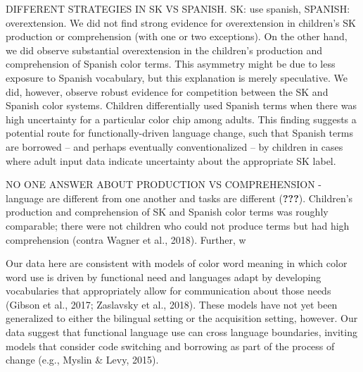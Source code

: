 \documentclass[
  english,
  ,man,floatsintext]{apa6}
\begin{document}
DIFFERENT STRATEGIES IN SK VS SPANISH. SK: use spanish, SPANISH: overextension. We did not find strong evidence for overextension in children's SK production or comprehension (with one or two exceptions). On the other hand, we did observe substantial overextension in the children's production and comprehension of Spanish color terms. This asymmetry might be due to less exposure to Spanish vocabulary, but this explanation is merely speculative. We did, however, observe robust evidence for competition between the SK and Spanish color systems. Children differentially used Spanish terms when there was high uncertainty for a particular color chip among adults. This finding suggests a potential route for functionally-driven language change, such that Spanish terms are borrowed -- and perhaps eventually conventionalized -- by children in cases where adult input data indicate uncertainty about the appropriate SK label.

NO ONE ANSWER ABOUT PRODUCTION VS COMPREHENSION - language are different from one another and tasks are different ({\textbf{???}}). Children's production and comprehension of SK and Spanish color terms was roughly comparable; there were not children who could not produce terms but had high comprehension (contra Wagner et al., 2018). Further, w

Our data here are consistent with models of color word meaning in which color word use is driven by functional need and languages adapt by developing vocabularies that appropriately allow for communication about those needs (Gibson et al., 2017; Zaslavsky et al., 2018). These models have not yet been generalized to either the bilingual setting or the acquisition setting, however. Our data suggest that functional language use can cross language boundaries, inviting models that consider code switching and borrowing as part of the process of change (e.g., Myslin \& Levy, 2015).
\end{document}
